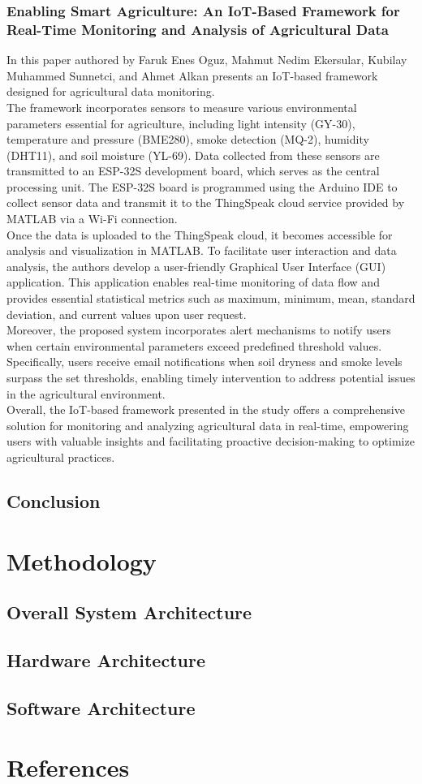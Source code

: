 \documentclass[12pt, a4paper]{article}
\begin{document}
\subsubsection{Enabling Smart Agriculture: An IoT-Based Framework for Real-Time Monitoring and Analysis of Agricultural Data}
In this paper authored by Faruk Enes Oguz, Mahmut Nedim Ekersular, Kubilay Muhammed Sunnetci, and Ahmet Alkan \cite{oguz2024enabling} presents an IoT-based framework designed for agricultural data monitoring.\\
The framework incorporates sensors to measure various environmental parameters essential for agriculture, including light intensity (GY-30), temperature and pressure (BME280), smoke detection (MQ-2), humidity (DHT11), and soil moisture (YL-69). Data collected from these sensors are transmitted to an ESP-32S development board, which serves as the central processing unit. The ESP-32S board is programmed using the Arduino IDE to collect sensor data and transmit it to the ThingSpeak cloud service provided by MATLAB via a Wi-Fi connection.\\
Once the data is uploaded to the ThingSpeak cloud, it becomes accessible for analysis and visualization in MATLAB. To facilitate user interaction and data analysis, the authors develop a user-friendly Graphical User Interface (GUI) application. This application enables real-time monitoring of data flow and provides essential statistical metrics such as maximum, minimum, mean, standard deviation, and current values upon user request.\\
Moreover, the proposed system incorporates alert mechanisms to notify users when certain environmental parameters exceed predefined threshold values. Specifically, users receive email notifications when soil dryness and smoke levels surpass the set thresholds, enabling timely intervention to address potential issues in the agricultural environment.\\
Overall, the IoT-based framework presented in the study offers a comprehensive solution for monitoring and analyzing agricultural data in real-time, empowering users with valuable insights and facilitating proactive decision-making to optimize agricultural practices.

\subsection{Conclusion}
\newpage

\section{Methodology}
\subsection{Overall System Architecture}
\subsection{Hardware Architecture}
\subsection{Software Architecture}
\newpage

\section{References}


\end{document}
